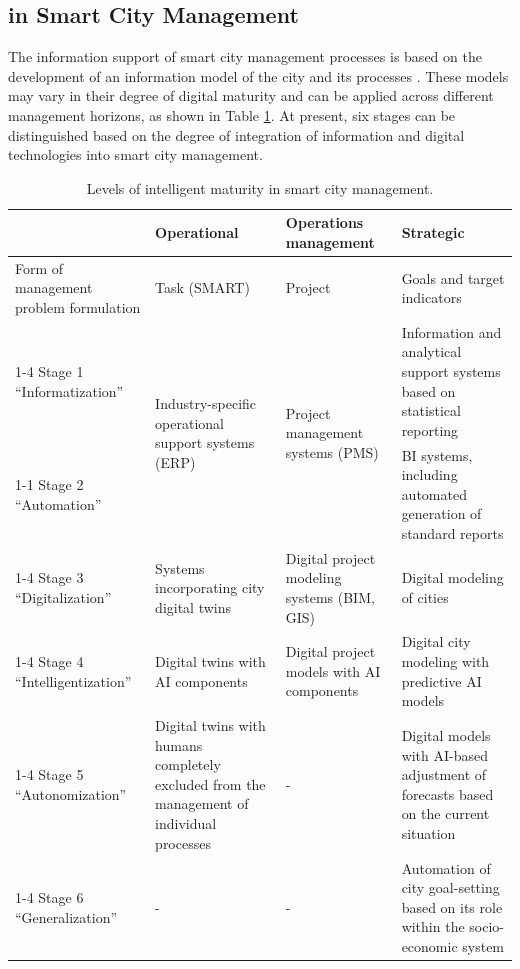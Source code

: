 \subsection{ in Smart City Management}

The information support of smart city management processes is based on the development of an information model of the city and its processes \cite{x1}.
These models may vary in their degree of digital maturity and can be applied across different management horizons, as shown in Table \ref{table:maturity}.
At present, six stages can be distinguished based on the degree of integration of information and digital technologies into smart city management.

\begin{table}[h]
\centering
\small
\begin{tabularx}{\textwidth}{X | X | X | X}
\hline
& \textbf{Operational}& \textbf{Operations management}& \textbf{Strategic}\\
\hline
Form of management problem formulation& Task (SMART)& Project& Goals and target indicators\\
\cline{1-4}
Stage 1 “Informatization”
& \multirow{2}{=}{Industry-specific operational support systems (ERP)}
& \multirow{2}{=}{Project management systems (PMS)}
& Information and analytical support systems based on statistical reporting\\
\cline{1-1}\cline{4-4}
Stage 2 “Automation”
&
&
& BI systems, including automated generation of standard reports\\
\cline{1-4}
Stage 3 “Digitalization”& Systems incorporating city digital twins \cite{x2}& Digital project modeling systems (BIM, GIS)& Digital modeling of cities \cite{x5}\\
\cline{1-4}
Stage 4 “Intelligentization”& Digital twins with AI components \cite{x8}& Digital project models with AI components& Digital city modeling with predictive AI models \cite{x4,x6}\\
\cline{1-4}
Stage 5 “Autonomization”& Digital twins with humans completely excluded from the management of individual processes \cite{x12}& -& Digital models with AI-based adjustment of forecasts based on the current situation \cite{x10}\\
\cline{1-4}
Stage 6 “Generalization”& -& -& Automation of city goal-setting based on its role within the socio-economic system\\
\hline
\end{tabularx}
\caption{Levels of intelligent maturity in smart city management.}
\label{table:maturity}
\end{table}


